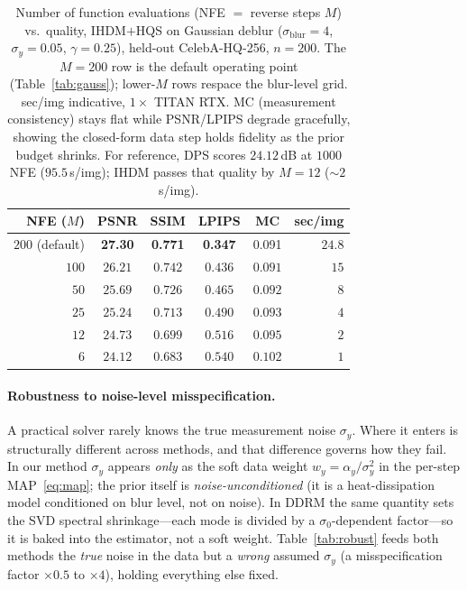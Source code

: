 \documentclass[11pt]{article}
\begin{document}
\begin{table}[h]
\centering
\caption{Number of function evaluations (NFE $=$ reverse steps $M$) vs.\ quality, IHDM$+$HQS on
Gaussian deblur ($\sigma_{\text{blur}}{=}4$, $\sigma_y{=}0.05$, $\gamma{=}0.25$), held-out
CelebA-HQ-256, $n{=}200$. The $M{=}200$ row is the default operating point (Table~\ref{tab:gauss});
lower-$M$ rows respace the blur-level grid. sec/img indicative, $1\times$ TITAN RTX. MC (measurement
consistency) stays flat while PSNR/LPIPS degrade gracefully, showing the closed-form data step holds
fidelity as the prior budget shrinks. For reference, DPS scores $24.12$\,dB at $1000$ NFE
($95.5$\,s/img); IHDM passes that quality by $M{=}12$ ($\sim\!2$\,s/img).}
\label{tab:nfe}
\begin{tabular}{rccccr}
\toprule
NFE ($M$) & PSNR & SSIM & LPIPS & MC & sec/img \\
\midrule
$200$ (default) & \textbf{27.30} & \textbf{0.771} & \textbf{0.347} & 0.091 & $24.8$ \\
$100$ & $26.21$ & $0.742$ & $0.436$ & $0.091$ & $15$ \\
$50$  & $25.69$ & $0.726$ & $0.465$ & $0.092$ & $8$ \\
$25$  & $25.24$ & $0.713$ & $0.490$ & $0.093$ & $4$ \\
$12$  & $24.73$ & $0.699$ & $0.516$ & $0.095$ & $2$ \\
$6$   & $24.12$ & $0.683$ & $0.540$ & $0.102$ & $1$ \\
\bottomrule
\end{tabular}
\end{table}

\paragraph{Robustness to noise-level misspecification.}
A practical solver rarely knows the true measurement noise $\sigma_y$. Where it enters is
structurally different across methods, and that difference governs how they fail. In our method
$\sigma_y$ appears \emph{only} as the soft data weight $w_y=\alpha_y/\sigma_y^2$ in the per-step
MAP~\eqref{eq:map}; the prior itself is \emph{noise-unconditioned} (it is a heat-dissipation model
conditioned on blur level, not on noise). In DDRM the same quantity sets the SVD spectral
shrinkage---each mode is divided by a $\sigma_0$-dependent factor---so it is baked into the estimator,
not a soft weight. Table~\ref{tab:robust} feeds both methods the \emph{true} noise in the data but a
\emph{wrong} assumed $\sigma_y$ (a misspecification factor $\times0.5$ to $\times4$), holding
everything else fixed.
\end{document}
